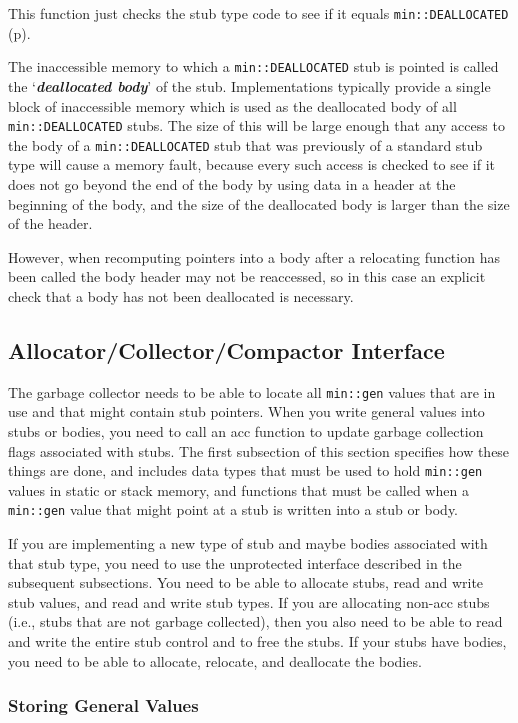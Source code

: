 \documentclass[12pt]{article}
\newcommand{\key}[1]{{\bf \em #1}\index{#1}}
\newcommand{\pagref}[1]{p\pageref{#1}}
\begin{document}
This function just checks the stub type code to see if it equals
{\tt min::DEALLOCATED} (\pagref{MIN::DEALLOCATED}).

The inaccessible memory to which a {\tt min::DEALLOCATED} stub is
pointed is called the `\key{deallocated body}' of the stub.
Implementations typically provide a single block of inaccessible memory
which is used as the deallocated body of all {\tt min::DEALLOCATED} stubs.
The size of this will be large enough that any access to the body of
a {\tt min::DEALLOCATED} stub that was previously of a
standard stub type will cause a memory fault, because every such access is
checked to see if it does not go beyond the end of the body by using
data in a header at the beginning of the body,
and the size of the deallocated body is larger than the size of the header.

However, when recomputing pointers into a body after a relocating
function has been called the body header may not be reaccessed,
so in this case an explicit check that a body has not been deallocated
is necessary.

\subsection{Allocator/Collector/Compactor Interface}
\label{ACC-INTERFACE}

The garbage collector needs to be able to locate all
\verb|min::gen| values that are in use and that might
contain stub pointers.
When you write general
values into stubs or bodies, you need to call an acc function
to update garbage collection flags associated with stubs.
The first subsection of this
section specifies how these things are done, and includes
data types that must be used to hold \verb|min::gen|
values in static or stack memory, and functions that must
be called when a \verb|min::gen| value that might point
at a stub is written into a stub or body.

If you are implementing a new type of stub and maybe bodies
associated with that stub type, you need to use the unprotected
interface described in the subsequent subsections.
You need to be able to allocate stubs, read and write stub values,
and read and write stub types.  If you are allocating non-acc
stubs (i.e., stubs that are not garbage collected), then you
also need to be able to read and write the entire stub control
and to free the stubs.
If your stubs have bodies, you need to be able to allocate,
relocate, and deallocate the bodies.

\subsubsection{Storing General Values}
\label{STORING-GENERAL-VALUES}
\end{document}

